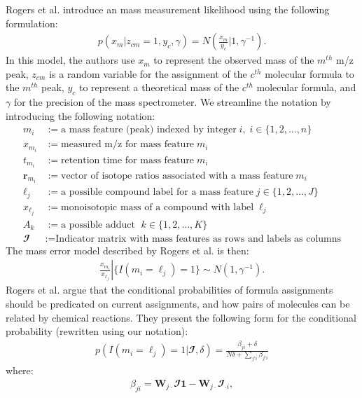 \begin{DoubleSpace*}
Rogers et al. introduce an mass measurement likelihood using the following formulation:
\begin{align}
	p(x_m|z_{cm}=1,y_c,\gamma)=N\left(\frac{x_m}{y_c}|1,\gamma^{-1} \right).
\end{align}
In this model, the authors use $x_m$ to represent the observed mass of the $m^{th}$ m/z peak, $z_{cm}$ is a random variable for the assignment of the $c^{th}$ molecular formula to the $m^{th}$ peak, $y_c$ to represent a theoretical mass of the $c^{th}$ molecular formula, and $\gamma$ for the precision of the mass spectrometer. We streamline the notation by introducing the following notation:
\begin{align*}
m_i &:=\text{a mass feature (peak) indexed by integer}\; i, \; i \in \{1,2,\hdots,n \} \\
x_{m_i} &:= \text{measured m/z for mass feature}\; m_i \\
t_{m_i} &:= \text{retention time for mass feature}\; m_i \\
\textbf{r}_{m_i} &:= \text{vector of isotope ratios associated with a mass feature}\; m_i \\
\ell_j &:= \text{a possible compound label for a mass feature}\; j\in\{1, 2, \hdots, J\} \\
x_{\ell_j} &:= \text{monoisotopic mass of a compound with label}\; \ell_j \\
A_k &:= \text{a possible adduct } \; k\in\{1, 2, \hdots, K\} \\
\mathbfcal{I} &:= \text{Indicator matrix with mass features as rows and labels as columns}
\end{align*} 
The mass error model described by Rogers et al. is then:
\begin{align}
	\left. \frac{x_{m_i}}{x_{\ell_j}} \right| \{ I(m_i=\ell_j )=1 \} \sim N\left(1, \gamma^{-1}\right).
\end{align}
Rogers et al. argue that the conditional probabilities of formula assignments should be predicated on current assignments, and how pairs of molecules can be related by chemical reactions. They present the following form for the conditional probability (rewritten using our notation):
\begin{align}
p( I(m_i=\ell_j )=1|\mathbfcal{I},\delta) =  \frac{\beta_{ji}+\delta}{N\delta+\sum_{j'i} \beta_{j'i}}
\end{align}
where:
\begin{align}
	\beta_{ji}=\textbf{W}_{j \cdot} \mathbfcal{I} \textbf{1} - \textbf{W}_{j \cdot} \mathbfcal{I}_{\cdot i}, 

\end{align}
\end{DoubleSpace*}
